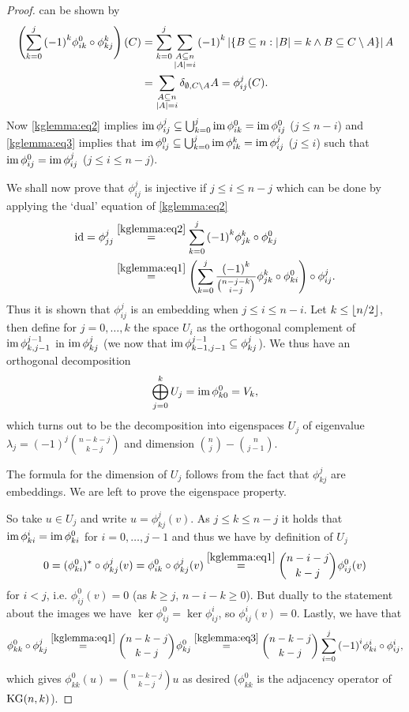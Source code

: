 \begin{proof}
  can be shown by
  \begin{align*}
      \left(\sum_{k=0}^{j}{{(-1)}^k\phi^0_{ik}\circ\phi^k_{kj}}\right)(C)
      & = \sum_{k=0}^{j}\sum_{\substack{A\subseteq n\\ \left|A\right|=i}}{{(-1)}^k\left|\{B\subseteq
              n:\left|B\right|=k\wedge  B\subseteq C\setminus A\}\right|A}\\
      & = \sum_{\substack{A\subseteq n\\ \left|A\right|=i}}{\delta_{\emptyset,C\setminus A}A} = \phi^j_{ij}(C)\text{.}
  \end{align*}
  Now \autoref{kglemma:eq2}
  implies $\mathop\mathrm{im}\phi_{ij}^j\subseteq\bigcup_{k=0}^j{\mathop\mathrm{im}\phi_{ik}^0}=\mathop\mathrm{im}\phi_{ij}^0$ ($j\leq n-i$) and \autoref{kglemma:eq3}
  implies that $\mathop\mathrm{im}\phi_{ij}^0\subseteq\bigcup_{k=0}^j{\mathop\mathrm{im}\phi_{ik}^k}=\mathop\mathrm{im}\phi_{ij}^j$ ($j\leq i$) such that $\mathop\mathrm{im}\phi_{ij}^0=\mathop\mathrm{im}\phi_{ij}^j$ ($j\leq i\leq n-j$).
  
  We shall now prove that $\phi^j_{ij}$ is injective if $j\leq i\leq n-j$ which can be done by applying the `dual' equation of \autoref{kglemma:eq2}
  \begin{align*}
      \id=\phi^j_{jj}
      & \stackrel{\autoref{kglemma:eq2}}{=}
      \sum_{k=0}^{j}{{(-1)}^k\phi^k_{jk}\compose\phi^0_{kj}}\\
      & \stackrel{\autoref{kglemma:eq1}}{=} \left(\sum_{k=0}^{j}{\frac{{(-1)}^k}{\binom{n-j-k}{i-j}}\phi^k_{jk}\compose\phi^0_{ki}}\right)\compose\phi^j_{ij}\text{.}
  \end{align*}
  Thus it is shown that $\phi^j_{ij}$ is an embedding when $j\leq i\leq n-i$. Let $k\leq \left\lfloor n/2\right\rfloor$, then define for $j=0,\ldots,k$ the space $U_i$ as the orthogonal complement of $\mathop\mathrm{im}\phi_{k,j-1}^{j-1}$ in $\mathop\mathrm{im}\phi_{kj}^j$ (we now that $\mathop\mathrm{im}\phi_{k-1,j-1}^{j-1}\subseteq\phi_{kj}^j$). We thus have an orthogonal decomposition
  $$
  \bigoplus_{j=0}^k{U_j}=\mathop\mathrm{im}\phi_{k0}^0=V_k,
  $$
  which turns out to be the decomposition into eigenspaces $U_j$ of eigenvalue $\lambda_j={(-1)}^j\binom{n-k-j}{k-j}$ and dimension $\binom{n}{j}-\binom{n}{j-1}$.

  The formula for the dimension of $U_j$ follows from the fact that $\phi_{kj}^j$ are embeddings. We are left to prove the eigenspace property.

  So take $u\in U_j$ and write $u=\phi_{kj}^j(v)$. As $j\leq k\leq n-j$ it holds that $\mathop\mathrm{im}\phi_{ki}^i=\mathop\mathrm{im}\phi_{ki}^0$ for $i=0,\ldots,j-1$ and thus we have by definition of $U_j$
  $$
  0=\dual{(\phi_{ki}^0)}\compose\phi_{kj}^j(v)=\phi_{ik}^0\compose\phi_{kj}^j(v)\stackrel{\autoref{kglemma:eq1}}{=}\binom{n-i-j}{k-j}\phi_{ij}^0(v)
  $$
  for $i<j$, i.e. $\phi_{ij}^0(v)=0$ (as $k\geq j$, $n-i-k\geq 0$). But dually to the statement about the images we have $\ker\phi_{ij}^0=\ker\phi_{ij}^i$, so $\phi_{ij}^i(v)=0$.
  Lastly, we have that
  $$
  \phi_{kk}^0\compose\phi_{kj}^j\stackrel{\autoref{kglemma:eq1}}{=}\binom{n-k-j}{k-j}\phi_{kj}^0\stackrel{\autoref{kglemma:eq3}}{=}\binom{n-k-j}{k-j}\sum_{i=0}^j{{(-1)}^i\phi_{ki}^i\compose\phi_{ij}^i},
  $$
  which gives $\phi_{kk}^0(u)=\binom{n-k-j}{k-j}u$ as desired ($\phi_{kk}^0$ is the adjacency operator of $\mathop\mathrm{KG}(n,k)$).
\end{proof}

